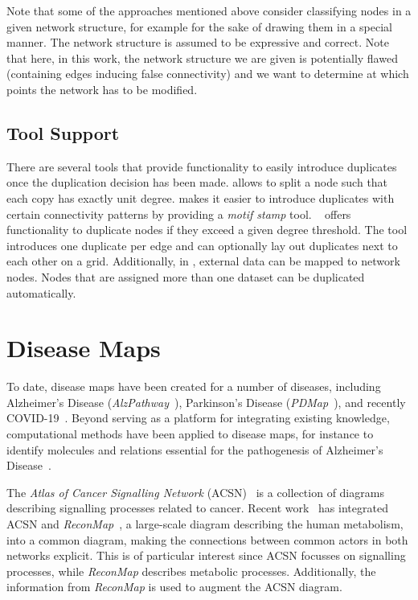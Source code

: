 \documentclass[
	fontsize=10pt, %
	twoside=true, %
	secnumdepth=1, %
  toc=indentunnumbered %
]{kaobook}
\begin{document}
Note that some of the approaches mentioned above consider classifying nodes in a given 
network structure, for example for the sake of drawing them in a special manner. The
network structure is assumed to be expressive and correct. Note
that here, in this work, the network structure we are given is potentially
flawed (containing edges inducing false connectivity) and we want to determine
at which points the network has to be modified. 


\subsection{Tool Support}
There are several tools that provide functionality to easily introduce
duplicates once the duplication decision has been made. 
\cite{villeger_ArcadiaVisualizationTool_2010} allows to split a node such that
each copy has exactly unit degree. 
\cite{droste_OmixVisualizationTool_2013} makes it easier to introduce duplicates
with certain connectivity patterns by providing a \textit{motif stamp} tool.
~\cite{rohn_VANTEDV2Framework_2012} offers functionality to
duplicate nodes if they exceed a given degree threshold. The tool introduces one
duplicate per edge and can optionally lay out duplicates next to each other on a
grid. Additionally, in , external data can be mapped to network
nodes. Nodes that are assigned more than one dataset can be 
duplicated automatically.
% 


\section{Disease Maps}
To date, disease maps have been created for a number of diseases, including
Alzheimer's Disease (\textit{AlzPathway}~\cite{ogishima_AlzPathwayUpdatedMap_2016}),
Parkinson's Disease (\textit{PDMap}~\cite{fujita_IntegratingPathwaysParkinson_2014}),
and recently \textsc{COVID-19}~\cite{ostaszewski_COVID19DiseaseMap_2020}.
%
Beyond serving as a platform for integrating existing knowledge, computational
methods have been applied to disease maps, for instance to identify molecules and
relations essential for the pathogenesis of Alzheimer's Disease~\cite{mizuno_NetworkAnalysisComprehensive_2016}.

The \textit{Atlas of Cancer Signalling Network} (ACSN)~\cite{kuperstein_AtlasCancerSignalling_2015} is a collection of diagrams
describing signalling processes related to cancer. Recent work~\cite{sompairac_metabolic_2019} has integrated ACSN and \textit{ReconMap}~\cite{noronha_ReconMapInteractiveVisualization_2017}, a large-scale diagram
describing the human metabolism, into a common diagram, making the connections
between common actors in both networks explicit. This is of particular interest
since ACSN focusses on signalling processes, while \textit{ReconMap} describes
metabolic processes. Additionally, the information from \textit{ReconMap} is
used to augment the ACSN diagram.
\end{document}

